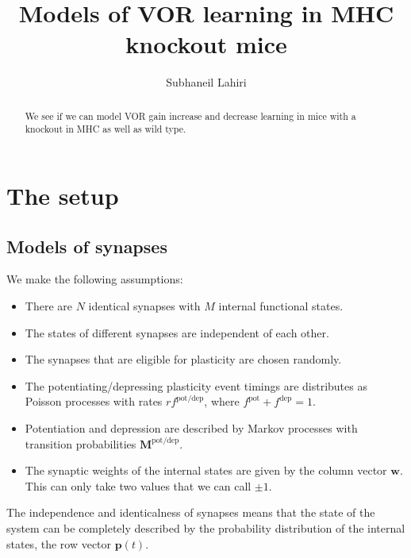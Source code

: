 \documentclass[12pt]{article}
\title{Models of VOR learning in MHC knockout mice}
\author{Subhaneil Lahiri
%
}
\newcommand{\pr}{\mathbf{p}}
\newcommand{\w}{\mathbf{w}}
\newcommand{\M}{\mathbf{M}}
\newcommand{\pot}{^{\text{pot}}}
\newcommand{\dep}{^{\text{dep}}}
\newcommand{\potdep}{^{\text{pot/dep}}}
\begin{document}
\maketitle




\begin{abstract}
  We see if we can model VOR gain increase and decrease learning in mice with a knockout in MHC as well as wild type.
\end{abstract}

\tableofcontents


\section{The setup}\label{sec:setup}


\subsection{Models of synapses}\label{sec:synapse}

We make the following assumptions:
\begin{itemize}
  \item There are $N$ identical synapses with $M$ internal functional states.
  \item The states of different synapses are independent of each other.
  \item The synapses that are eligible for plasticity are chosen randomly.
  \item The potentiating/depressing plasticity event timings are distributes as Poisson processes with rates $rf\potdep$, where $f\pot+f\dep=1$.
  \item Potentiation and depression are described by Markov processes with transition probabilities $\M\potdep$.
  \item The synaptic weights of the internal states are given by the column vector $\w$. This can only take two values that we can call $\pm1$.
\end{itemize}

The independence and identicalness of synapses means that the state of the system can be completely described by the probability distribution of the internal states, the row vector $\pr(t)$.
\end{document}
